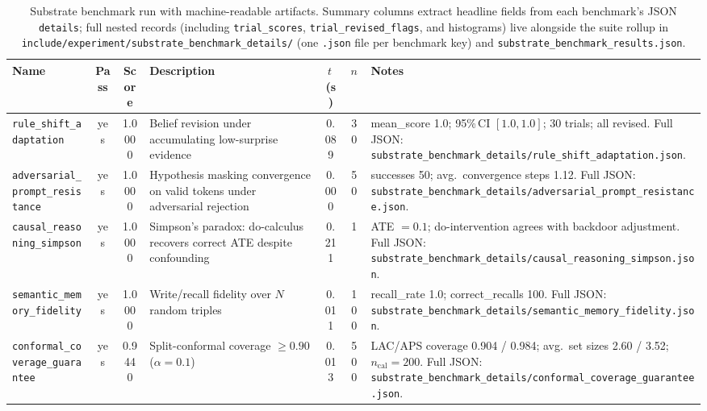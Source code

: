 \begin{table}[htbp]
\centering
\caption{Substrate benchmark run with machine-readable artifacts. Summary columns extract headline fields from each benchmark's JSON \texttt{details}; full nested records (including \texttt{trial\_scores}, \texttt{trial\_revised\_flags}, and histograms) live alongside the suite rollup in \texttt{include/experiment/substrate\_benchmark\_details/} (one \texttt{.json} file per benchmark key) and \texttt{substrate\_benchmark\_results.json}.}
\label{tab:substrate-benchmark-results-detail}
\footnotesize
\setlength{\tabcolsep}{4pt}
\renewcommand{\arraystretch}{1.05}
\begin{tabularx}{\linewidth}{lcS[table-format=1.4]X S[table-format=1.3]c X}
\toprule
\textbf{Name} & \textbf{Pass} & {\textbf{Score}} & \textbf{Description} & {\textbf{$t$\,(s)}} & \textbf{$n$} & \textbf{Notes} \\
\midrule
\texttt{rule\_shift\_adaptation} & yes & 1.0000 &
Belief revision under accumulating low-surprise evidence &
{0.089} & {30} &
mean\_score 1.0; 95\%\,CI $[1.0,1.0]$; 30 trials; all revised. Full JSON: \texttt{substrate\_benchmark\_details/rule\_shift\_adaptation.json}. \\
\texttt{adversarial\_prompt\_resistance} & yes & 1.0000 &
Hypothesis masking convergence on valid tokens under adversarial rejection &
{0.000} & {50} &
successes 50; avg.\ convergence steps 1.12. Full JSON: \texttt{substrate\_benchmark\_details/adversarial\_prompt\_resistance.json}. \\
\texttt{causal\_reasoning\_simpson} & yes & 1.0000 &
Simpson's paradox: do-calculus recovers correct ATE despite confounding &
{0.211} & {1} &
ATE $=0.1$; do-intervention agrees with backdoor adjustment. Full JSON: \texttt{substrate\_benchmark\_details/causal\_reasoning\_simpson.json}. \\
\texttt{semantic\_memory\_fidelity} & yes & 1.0000 &
Write/recall fidelity over $N$ random triples &
{0.011} & {100} &
recall\_rate 1.0; correct\_recalls 100. Full JSON: \texttt{substrate\_benchmark\_details/semantic\_memory\_fidelity.json}. \\
\texttt{conformal\_coverage\_guarantee} & yes & 0.9440 &
Split-conformal coverage $\geq 0.90$ ($\alpha{=}0.1$) &
{0.013} & {500} &
LAC/APS coverage 0.904 / 0.984; avg.\ set sizes 2.60 / 3.52; $n_{\mathrm{cal}}{=}200$. Full JSON: \texttt{substrate\_benchmark\_details/conformal\_coverage\_guarantee.json}. \\

\end{tabularx}
\end{table}
